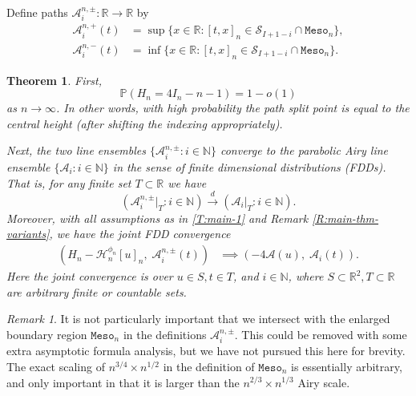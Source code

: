 \documentclass[11pt,twoside]{amsart}
\theoremstyle{plain}
\newtheorem{thm}{Theorem}[section]
\numberwithin{quest}{section}
\theoremstyle{remark}
\newtheorem{rem}{Remark}
\numberwithin{rem}{section}
\theoremstyle{definition}
\newcommand{\N}{\mathbb{N}}
\newcommand{\R}{\mathbb{R}}
\renewcommand{\P}{\mathbb{P}}
\newcommand{\cA}{\mathcal{A}}
\newcommand{\cS}{\mathcal{S}}
\newcommand{\cH}{\mathcal{H}}
\newcommand{\cvgd}{\stackrel{d}{\to}}
\renewcommand{\tt}[1]{{\mathtt{#1}}}
\begin{document}
    Define paths $\cA_i^{n, \pm}:\R \to \R$ by
	\begin{align*}
		\cA_i^{n, +}(t) &= \sup \{ x \in \R: [t, x]_n \in \cS_{I + 1 - i} \cap \tt{Meso}_n \}, \\
		\cA_i^{n, -}(t) &= \inf \{ x \in \R : [t, x]_n \in \cS_{I + 1 -i}  \cap \tt{Meso}_n\}.
	\end{align*}
	\begin{thm}
		\label{T:main-2}
		First, $$
		\P(H_n = 4I_n - n - 1) = 1 - o(1)
		$$
		as $n\to \infty$. In other words, with high probability the path split point is equal to the central height (after shifting the indexing appropriately). 
		
		Next, the two line ensembles $\{\cA_i^{n, \pm} : i \in \N\}$ converge to the parabolic Airy line ensemble $\{\cA_i : i \in \N\}$ in the sense of finite dimensional distributions (FDDs). That is, for any finite set $T \subset \R$ we have
		\begin{equation}
			\label{E:Ain-intro}
			(\cA_i^{n, \pm}|_T : i \in \N) \cvgd (\cA_i|_T : i \in \N).
		\end{equation}
		Moreover, with all assumptions as in \cref{T:main-1} and Remark \ref{R:main-thm-variants}, we have the joint FDD convergence
		\begin{equation}
			\label{E:Ain-joint-intro}
			\begin{split}
				(H_n - \cH_n^{\phi_n}[u]_n, \;  \cA_i^{n, \pm}(t))
				&\implies (-4 \cA(u), \; \cA_i(t)).
			\end{split}
		\end{equation}
        	Here the joint convergence is over $u \in S, t \in T$, and $i \in \N$, where $S \subset \R^2, T \subset \R$ are arbitrary finite or countable sets. 
		\end{thm}

\begin{rem}
It is not particularly important that we intersect with the enlarged boundary region $\tt{Meso}_n$ in the definitions $\cA_i^{n, \pm}$. This could be removed with some extra asymptotic formula analysis, but we have not pursued this here for brevity. The exact scaling of $n^{3/4} \times n^{1/2}$ in the definition of $\tt{Meso}_n$ is essentially arbitrary, and only important in that it is larger than the $n^{2/3} \times n^{1/3}$ Airy scale.
\end{rem}
\end{document}
